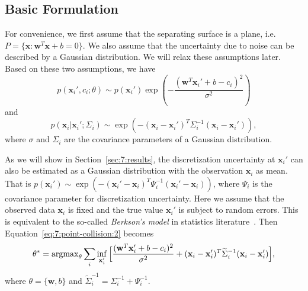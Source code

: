 \subsection{Basic Formulation}
\label{sec:7:algorithm:1}
For convenience, we first assume that the separating surface is a plane, i.e. $P = \{\mathbf x: \mathbf w^T \mathbf x + b = 0\}$. We also assume that the uncertainty due to noise can be described by a Gaussian distribution. We will relax these assumptions later.
Based on these two assumptions, we have
\begin{equation}
p(\mathbf x_i', c_i; \theta) \sim p(\mathbf x_i') \exp(-\frac{(\mathbf w^T \mathbf x_i' + b - c_i)^2}{\sigma^2}) 
\end{equation}
and
\begin{equation}
p(\mathbf x_i | \mathbf x_i'; \Sigma_i) \sim \exp(-(\mathbf x_i - \mathbf x_i')^T \Sigma_i^{-1} (\mathbf x_i - \mathbf x_i')),
\end{equation}
where $\sigma$ and $\Sigma_i$ are the covariance parameters of a Gaussian distribution.

As we will show in Section~\ref{sec:7:results}, the discretization uncertainty at $\mathbf x_i'$ can also be estimated as a Gaussian distribution with the observation $\mathbf x_i$ as mean. That is $p(\mathbf x_i') \sim \exp(-(\mathbf x_i' - \mathbf x_i)^T \Psi_i^{-1} (\mathbf x_i' - \mathbf x_i))$, where $\Psi_i$ is the covariance parameter for discretization uncertainty. Here we assume that the observed data $\mathbf x_i$ is fixed and the true value $\mathbf x_i'$ is subject to random errors. This is equivalent to the so-called \emph{Berkson's model} in statistics literature~\cite{Berkson:1950}.
Then Equation~\ref{eq:7:point-collision:2} becomes
\begin{equation}
\label{eq:7:point-collision:3}
\theta^* = \operatorname{argmax}_{\theta} \sum_i \inf_{\mathbf x_i'} \Big[\frac{(\mathbf w^T \mathbf x_i' + b - c_i)^2}{\sigma^2} + (\mathbf x_i - \mathbf x_i')^T \widetilde{\Sigma}_i^{-1} (\mathbf x_i - \mathbf x_i')\Big],
\end{equation}
where $\theta = \{\mathbf w, b\}$ and $\widetilde{\Sigma}_i^{-1} = \Sigma_i^{-1} + \Psi_i^{-1}$.

